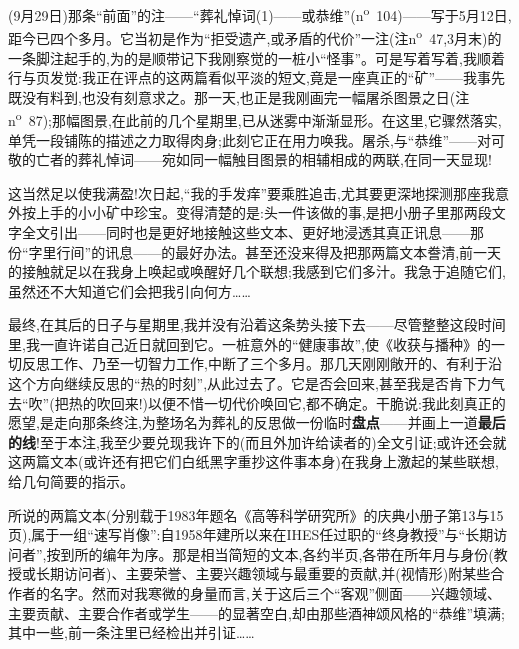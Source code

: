 (9月29日)那条“前面”的注——“葬礼悼词(1)——或恭维”(n\textsuperscript{o}~104)——写于5月12日,距今已四个多月。它当初是作为“拒受遗产,或矛盾的代价”一注(注n\textsuperscript{o}~47,3月末)的一条脚注起手的,为的是顺带记下我刚察觉的一桩小“怪事”。可是写着写着,我顺着行与页发觉:我正在评点的这两篇看似平淡的短文,竟是一座真正的“矿”——我事先既没有料到,也没有刻意求之。那一天,也正是我刚画完一幅屠杀图景之日(注n\textsuperscript{o}~87);那幅图景,在此前的几个星期里,已从迷雾中渐渐显形。在这里,它骤然落实,单凭一段铺陈的描述之力取得肉身;此刻它正在用力唤我。屠杀,与“恭维”——对可敬的亡者的葬礼悼词——宛如同一幅触目图景的相辅相成的两联,在同一天显现!

这当然足以使我满盈!次日起,“我的手发痒”要乘胜追击,尤其要更深地探测那座我意外按上手的小小矿中珍宝。变得清楚的是:头一件该做的事,是把小册子里那两段文字全文引出——同时也是更好地接触这些文本、更好地浸透其真正讯息——那份“字里行间”的讯息——的最好办法。甚至\dmark{}还没来得及把那两篇文本誊清,前一天的接触就足以在我身上唤起或唤醒好几个联想;我感到它们多汁。我急于追随它们,虽然还不大知道它们会把我引向何方……

最终,在其后的日子与星期里,我并没有沿着这条势头接下去——尽管整整这段时间里,我一直许诺自己近日就回到它。一桩意外的“健康事故”,使《收获与播种》的一切反思工作、乃至一切智力工作,中断了三个多月。那几天刚刚敞开的、有利于沿这个方向继续反思的“热的时刻”,从此过去了。它是否会回来,甚至我是否肯下力气去“吹”(把热的吹回来!)以便不惜一切代价唤回它,都不确定。干脆说:我此刻真正的愿望,是走向那条终注,为整场名为葬礼的反思做一份临时\textbf{盘点}——并画上一道\textbf{最后的线}!至于本注,我至少要兑现我许下的(而且外加许给读者的)全文引证;或许还会就这两篇文本(或许还有把它们白纸黑字重抄这件事本身)在我身上激起的某些联想,给几句简要的指示。

所说的两篇文本(分别载于1983年题名《高等科学研究所》的庆典小册子第13与15页),属于一组“速写肖像”:自1958年建所以来在IHES任过职的“终身教授”与“长期访问者”,按到所的编年为序。那是相当简短的文本,各约半页,各带在所年月与身份(教授或长期访问者)、主要荣誉、主要兴趣领域与最重要的贡献,并(视情形)附某些合作者的名字。然而对我寒微的身量而言,关于这后三个“客观”侧面——兴趣领域、主要贡献、主要合作者或学生——的显著空白,却由那些酒神颂风格的“恭维”填满;其中一些,前一条注里已经检出并引证……\dmark{}

